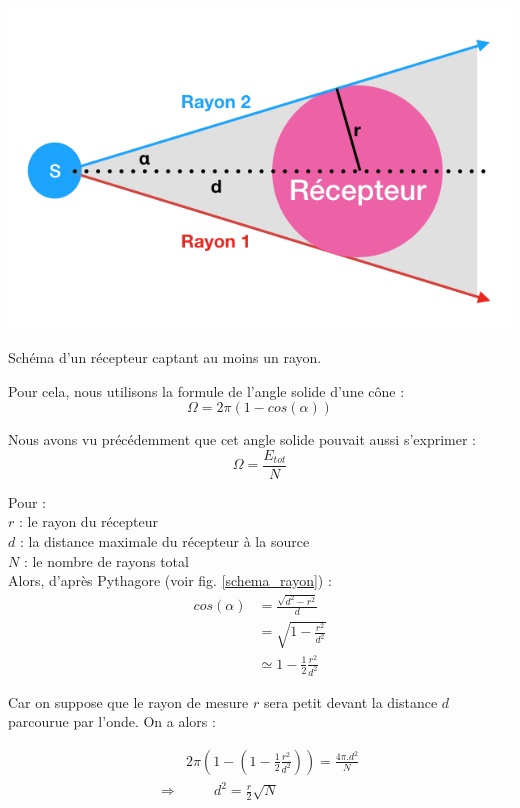 \begin{figureth}
	\includegraphics[width=0.8\linewidth]{images/schema_rayon}
	\caption{Schéma d'un récepteur captant au moins un rayon.}
	\label{schema_rayon}
\end{figureth}

Pour cela, nous utilisons la formule de l'angle solide d'une cône :
\begin{equation}
	\Omega = 2\pi(1-cos(\alpha))
\end{equation}

Nous avons vu précédemment que cet angle solide pouvait aussi s'exprimer :
\begin{equation}
	\Omega = \frac{E_{tot}}{N}
\end{equation}

Pour : \\
$r$ : le rayon du récepteur \\
$d$ : la distance maximale du récepteur à la source \\
$N$ : le nombre de rayons total \\

Alors, d'après Pythagore (voir fig. \ref{schema_rayon}) :
\begin{align}
	cos(\alpha) & =  \frac{\sqrt{d^2-r^2}}{d}  \\
	& =  \sqrt{1-\frac{r^2}{d^2}} \\
	& \simeq 1-\frac{1}{2}\frac{r^2}{d^2}
\end{align}

Car on suppose que le rayon de mesure $r$ sera petit devant la distance $d$ parcourue par l'onde. On a alors :

\begin{align} 
	& 2\pi(1-(1-\frac{1}{2}\frac{r^2}{d^2})) = \frac{4\pi.d^2}{N} \\
	\Rightarrow & \qquad d^2 = \frac{r}{2}\sqrt{N} \label{seuil_arret}
\end{align}

